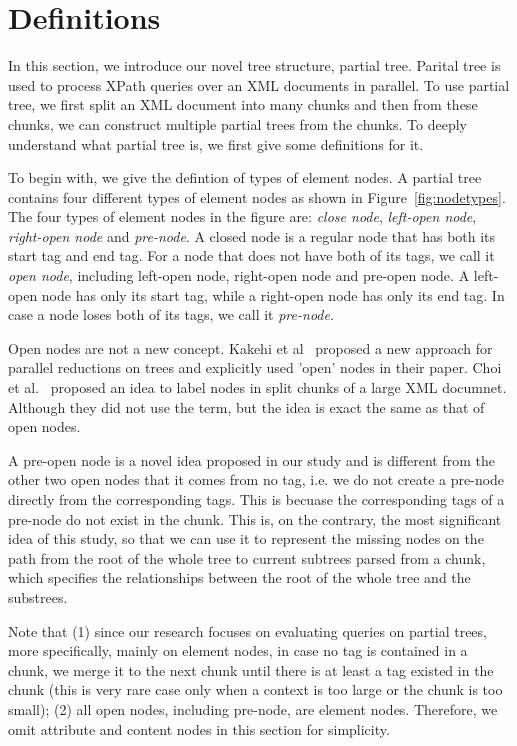 \section{Definitions}
\label{sec:partialtree}

In this section, we introduce our novel tree structure, partial tree. Parital
tree  is used to process XPath queries over an XML documents in parallel. To use
partial tree, we first split an XML document into many chunks and then from
these chunks, we can construct multiple partial trees from the chunks. To deeply
understand what partial tree is, we first give some definitions for it.


To begin with, we give the defintion of types of element nodes. A partial
tree contains four different types of element nodes as shown in
Figure~\ref{fig:nodetypes}. The four types of element nodes in the figure are:
\emph{close node},  \emph{left-open node},  \emph{right-open node} and
\emph{pre-node}. A closed node is a regular node that has both its start tag and
end tag. For a node that does not have both of its tags, we call it \emph{open
node}, including left-open node, right-open node and pre-open node. A left-open
node has only its start tag, while a right-open node has only its end tag. In
case a node loses both of its tags, we call it \emph{pre-node}.

Open nodes are not a new concept. Kakehi et al~\cite{KaME07} proposed a new
approach for parallel reductions on trees and explicitly used 'open' nodes in
their paper. Choi et al.~\cite{ChLL14} proposed an idea to label nodes in split
chunks of a large XML documnet. Although they did not use the term, but the idea
is exact the same as that of open nodes.

A pre-open node is a novel idea proposed in our study and is different from the
other two open nodes that it comes from no tag, i.e. we do not create a pre-node
directly from the corresponding tags. This is becuase the corresponding tags of
a pre-node do not exist in the chunk.  This is, on the contrary, the most
significant idea of this study, so that we can use it to represent the missing
nodes on the path from the root of the whole tree to current subtrees parsed
from a chunk, which specifies the relationships between the root of the whole
tree and the substrees.

Note that (1) since our research focuses on evaluating queries on partial trees,
more specifically, mainly on element nodes, in case no tag is contained in a
chunk, we merge it to the next chunk until there is at least a tag existed in
the chunk (this is very rare case only when a context is too large or the chunk
is too small); (2) all open nodes, including pre-node, are element nodes.
Therefore, we omit attribute and content nodes in this section for
simplicity.

